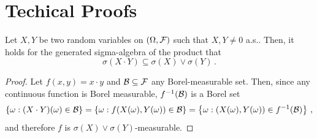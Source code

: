 \section{Techical Proofs}\label{apx:technical_proofs}
\begin{lemma}\label{lem:sigma_prod}
Let $X, Y$ be two random variables on $(\Omega, \mathcal{F})$ such that $X, Y \neq 0$ a.s.. Then, it holds for the generated sigma-algebra of the product that
$$
\sigma(X\cdot Y) \subseteq \sigma(X)\lor\sigma(Y)\,.
$$
\end{lemma}
\begin{proof}
Let $f(x, y)=x\cdot y$ and $\mathcal{B}\subseteq \mathcal{F}$ any Borel-measurable set. Then, since any continuous function is Borel measurable, $f^{-1}(\mathcal{B})$ is a Borel set
\[
\{\omega:(X\cdot Y)(\omega) \in \mathcal{B}\}=\{\omega: f(X(\omega), Y(\omega)) \in \mathcal{B}\}=\left\{\omega:(X(\omega), Y(\omega)) \in f^{-1}(\mathcal{B})\right\}\,,
\]
and therefore $f$ is $\sigma(X)\lor\sigma(Y)$-measurable.
\end{proof}

